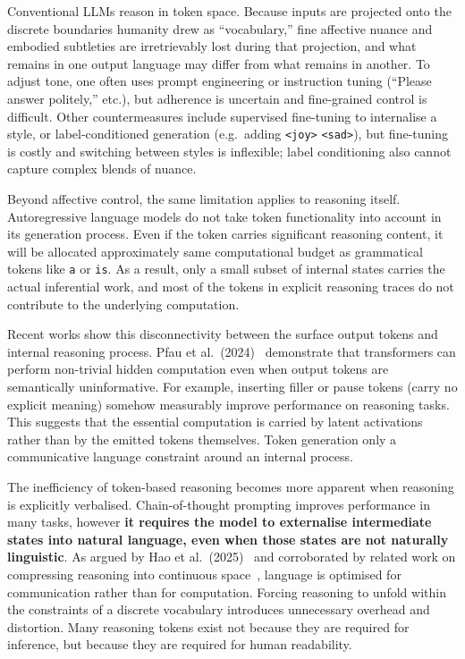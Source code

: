 Conventional LLMs reason in token space. Because inputs are projected onto the discrete boundaries humanity drew as ``vocabulary,'' fine affective nuance and embodied subtleties are irretrievably lost during that projection, and what remains in one output language may differ from what remains in another. To adjust tone, one often uses prompt engineering or instruction tuning (``Please answer politely,'' etc.), but adherence is uncertain and fine-grained control is difficult. Other countermeasures include supervised fine-tuning to internalise a style, or label-conditioned generation (e.g.\, adding \texttt{<joy>} \texttt{<sad>}), but fine-tuning is costly and switching between styles is inflexible; label conditioning also cannot capture complex blends of nuance.

Beyond affective control, the same limitation applies to reasoning itself. Autoregressive language models do not take token functionality into account in its generation process. Even if the token carries significant reasoning content, it will be allocated approximately same computational budget as grammatical tokens like \texttt{a} or \texttt{is}. As a result, only a small subset of internal states carries the actual inferential work, and most of the tokens in explicit reasoning traces do not contribute to the underlying computation.

Recent works show this disconnectivity between the surface output tokens and internal reasoning process. Pfau et al.\ (2024)~\cite{pfau2024lets} demonstrate that transformers can perform non-trivial hidden computation even when output tokens are semantically uninformative. For example, inserting filler or pause tokens (carry no explicit meaning) somehow measurably improve performance on reasoning tasks. This suggests that the essential computation is carried by latent activations rather than by the emitted tokens themselves. Token generation only a communicative language constraint around an internal process.

The inefficiency of token-based reasoning becomes more apparent when reasoning is explicitly verbalised. Chain-of-thought prompting improves performance in many tasks, however \textbf{it requires the model to externalise intermediate states into natural language, even when those states are not naturally linguistic}. As argued by Hao et al.\ (2025)~\cite{hao2025traininglargelanguagemodels} and corroborated by related work on compressing reasoning into continuous space~\cite{shen2025codicompressingchainofthoughtcontinuous}, language is optimised for communication rather than for computation. Forcing reasoning to unfold within the constraints of a discrete vocabulary introduces unnecessary overhead and distortion. Many reasoning tokens exist not because they are required for inference, but because they are required for human readability.

